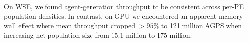
On WSE, we found agent-generation throughput to be consistent across per-PE population densities.
In contrast, on GPU we encountered an apparent memory-wall effect where mean  throughput dropped $>95\%$ to 121 million AGPS when increasing net population size from 15.1 million to 175 million.






